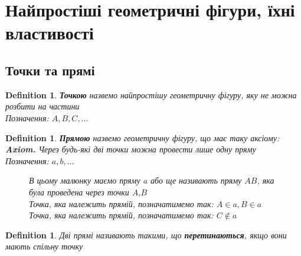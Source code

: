 \documentclass[a4paper, 14pt]{extarticle}
\theoremstyle{theoremdd}
\theoremstyle{theoremdd}
\newtheorem{definition}[theorem]{Definition}
\theoremstyle{theoremdd}
\theoremstyle{theoremdd}
\theoremstyle{theoremdd}
\theoremstyle{theoremdd}
\theoremstyle{theoremdd}
\theoremstyle{theoremdd}
\begin{document}
\tableofcontents
\newpage

\section{Найпростіші геометричні фігури, їхні властивості}
\subsection{Точки та прямі}
\begin{definition}
\textbf{Точкою} назвемо найпростішу геометричну фігуру, яку не можна розбити на частини\\
Позначення: $A,B,C,\dots$
\begin{figure}[H]
\centering
{}
\end{figure}
\end{definition}

\begin{definition}
\textbf{Прямою} назвемо геометричну фігуру, що має таку аксіому:\\
\textbf{Axiom.} Через будь-які дві точки можна провести лише одну пряму\\
Позначення: $a,b,\dots$
\begin{figure}[H]
\centering
{}
\caption*{В цьому малюнку маємо пряму $a$ або ще називають пряму $AB$, яка була проведена через точки $A$,$B$ \\
Точка, яка належить прямій, позначатимемо так: $A \in a, B \in a$ \\
Точка, яка належить прямій, позначатимемо так: $C \not\in a$ \\}
\end{figure}
\end{definition}

\begin{definition}
Дві прямі називають такими, що \textbf{перетинаються}, якщо вони мають спільну точку
\begin{figure}[H]
\centering
{}
\end{figure}
\end{definition}
\end{document}

